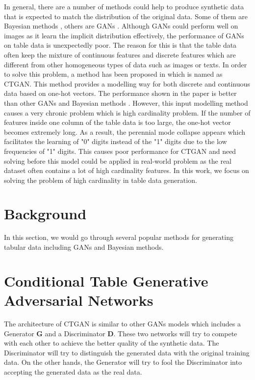 \documentclass{article}
\begin{document}
In general, there are a number of methods could help to produce synthetic data that is expected to match the distribution of the original data. Some of them are Bayesian methods \cite{chow1968approximating} \cite{zhang2017privbayes}, others are \ac{GANs} \cite{choi2017generating} \cite{srivastava2017veegan} \cite{park2018data}. Although \ac{GANs} could perform well on images as it learn the implicit distribution effectively, the performance of \ac{GANs} on table data is unexpectedly poor. The reason for this is that the table data often keep the mixture of continuous features and discrete features which are different from other homogeneous types of data such as images or texts. In order to solve this problem, a method has been proposed in \cite{xu2019modeling} which is named as \ac{CTGAN}. This method provides a modelling way for both discrete and continuous data based on one-hot vectors. The performance shown in the paper \cite{xu2019modeling} is better than other \ac{GANs} \cite{choi2017generating} \cite{srivastava2017veegan} \cite{park2018data} and Bayesian methods \cite{chow1968approximating} \cite{zhang2017privbayes}. However, this input modelling method causes a very chronic problem which is high cardinality problem. If the number of features inside one column of the table data is too large, the one-hot vector becomes extremely long. As a result, the perennial mode collapse appears which facilitates the learning of "0" digits instead of the "1" digits due to the low frequencies of "1" digits. This causes poor performance for \ac{CTGAN} and need solving before this model could be applied in real-world problem as the real dataset often contains a lot of high cardinality features. In this work, we focus on solving the problem of high cardinality in table data generation. 

\section{Background}

In this section, we would go through several popular methods for generating tabular data including \ac{GANs} and Bayesian methods.



\section{Conditional Table Generative Adversarial Networks}\label{ktcs}

The architecture of \ac{CTGAN} is similar to other \ac{GANs} models which includes a Generator $\mathbf{G}$ and a Discriminator $\mathbf{D}$. These two networks will try to compete with each other to achieve the better quality of the synthetic data. The Discriminator will try to distinguish the generated data with the original training data. On the other hands, the Generator will try to fool the Discriminator into accepting the generated data as the real data. 
\end{document}
